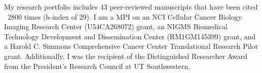 My research portfolio includes 43 peer-reviewed manuscripts that have been cited ~2800 times (h-index of 29). I am a MPI on an NCI Cellular Cancer Biology Imaging Research Center (U54CA268072) grant, an NIGMS Biomedical Technology Development and Dissemination Center (RM1GM145399) grant, and a Harold C. Simmons Comprehensive Cancer Center Translational Research Pilot grant. Additionally, I was the recipient of the Distinguished Researcher Award from the President’s Research Council at UT Southwestern.

